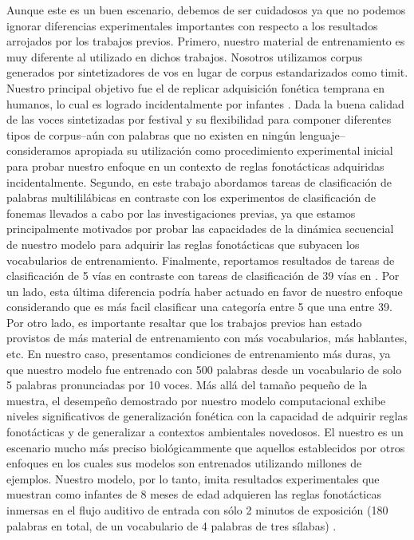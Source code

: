 {Aunque este es un buen escenario, debemos de ser cuidadosos ya que no podemos ignorar diferencias experimentales importantes con respecto a los resultados arrojados por los trabajos previos. Primero, nuestro material de entrenamiento es muy diferente  al utilizado en dichos trabajos. Nosotros utilizamos corpus generados por sintetizadores de vos en lugar de corpus estandarizados como \gls{timit}.
Nuestro principal objetivo fue el de replicar adquisición fonética temprana en humanos, lo cual es logrado incidentalmente por infantes \cite{Saffran1996StatisticalLB}.
Dada la buena calidad de las voces sintetizadas por \gls{festival}  \cite{festival2014} y su flexibilidad para componer diferentes tipos de corpus--aún con palabras que no existen en ningún lenguaje--consideramos apropiada su utilización como procedimiento experimental inicial para probar nuestro enfoque en un contexto de reglas fonotácticas adquiridas incidentalmente.
Segundo, en este trabajo abordamos tareas de clasificación de palabras multililábicas en contraste con los experimentos de clasificación de fonemas llevados a cabo por las investigaciones previas, ya que estamos principalmente motivados por probar las capacidades de la dinámica secuencial de nuestro modelo para adquirir las reglas fonotácticas que subyacen los vocabularios de entrenamiento.
Finalmente, reportamos resultados de tareas de clasificación de 5 vías en contraste con tareas de clasificación de 39 vías en \cite{Lee:2009:UFL:2984093.2984217}.
Por un lado, esta última diferencia podría haber actuado en favor de nuestro enfoque considerando que es más facil clasificar una categoría entre 5 que una entre 39.
Por otro lado, es importante resaltar que los trabajos previos han estado provistos de más material de entrenamiento con más vocabularios, más hablantes, etc.
En nuestro caso, presentamos condiciones de entrenamiento más duras, ya que nuestro modelo fue entrenado con 500 palabras desde un vocabulario de solo 5 palabras pronunciadas por 10 voces.
Más allá del tamaño pequeño de la muestra, el desempeño demostrado por nuestro modelo computacional exhibe niveles significativos de generalización fonética con la capacidad de adquirir reglas fonotácticas y de generalizar a contextos ambientales novedosos. El nuestro es un escenario mucho más preciso biológicammente que aquellos establecidos por otros enfoques en los cuales sus modelos son entrenados utilizando millones de ejemplos. Nuestro modelo, por lo tanto, imita resultados experimentales que muestran como infantes de 8 meses de edad adquieren las reglas fonotácticas inmersas en el flujo auditivo de entrada con sólo 2 minutos de exposición (180 palabras en total, de un vocabulario de 4 palabras de tres sílabas) \cite{Saffran1996StatisticalLB}.

}
